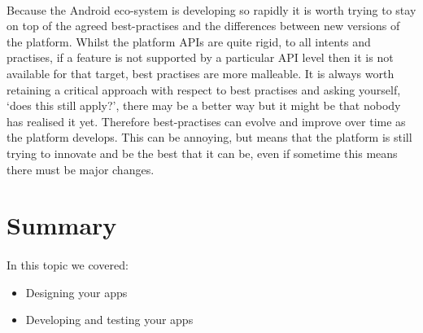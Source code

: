 \documentclass[12pt, a4paper, twoside]{book}
\begin{document}
\paragraph{} Because the Android eco-system is developing so rapidly it is worth trying to stay on top of the agreed best-practises and the differences between new versions of the platform. Whilst the platform APIs are quite rigid, to all intents and practises, if a feature is not supported by a particular API level then it is not available for that target, best practises are more malleable. It is always worth retaining a critical approach with respect to best practises and asking yourself, `does this still apply?', there may be a better way but it might be that nobody has realised it yet. Therefore best-practises can evolve and improve over time as the platform develops. This can be annoying, but means that the platform is still trying to innovate and be the best that it can be, even if sometime this means there must be major changes.

\section{Summary}
\paragraph{}

\paragraph{} In this topic we covered: 
\begin{itemize}
\item Designing your apps
\item Developing and testing your apps
\end{itemize}
\end{document}
